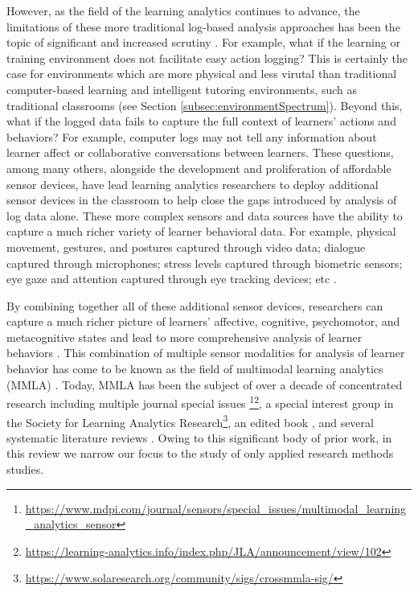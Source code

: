 \documentclass[manuscript,screen,review]{acmart}
\begin{document}
However, as the field of the learning analytics continues to advance, the limitations of these more traditional log-based analysis approaches has been the topic of significant and increased scrutiny \cite{ochoa2017multimodal}. For example, what if the learning or training environment does not facilitate easy action logging? This is certainly the case for environments which are more physical and less virutal than traditional computer-based learning and intelligent tutoring environments, such as traditional classrooms (see Section \ref{subsec:environmentSpectrum}). Beyond this, what if the logged data fails to capture the full context of learners' actions and behaviors? For example, computer logs may not tell any information about learner affect or collaborative conversations between learners. These questions, among many others, alongside the development and proliferation of affordable sensor devices, have lead learning analytics researchers to deploy additional sensor devices in the classroom to help close the gaps introduced by analysis of log data alone. These more complex sensors and data sources have the ability to capture a much richer variety of learner behavioral data. For example, physical movement, gestures, and postures captured through video data; dialogue captured through microphones; stress levels captured through biometric sensors; eye gaze and attention captured through eye tracking devices; etc \cite{vatral2022using}. 

By combining together all of these additional sensor devices, researchers can capture a much richer picture of learners' affective, cognitive, psychomotor, and metacognitive states and lead to more comprehensive analysis of learner behaviors \cite{blikstein2016multimodal}. This combination of multiple sensor modalities for analysis of learner behavior has come to be known as the field of multimodal learning analytics (MMLA) \cite{blikstein2013multimodal, blikstein2016multimodal, worsley_multimodal_2018}. Today, MMLA has been the subject of over a decade of concentrated research including multiple journal special issues \cite{BJETSpecialIssue}\footnote{\href{https://www.mdpi.com/journal/sensors/special_issues/multimodal_learning_analytics_sensor}{https://www.mdpi.com/journal/sensors/special\_issues/multimodal\_learning\_analytics\_sensor}}\footnote{\href{https://learning-analytics.info/index.php/JLA/announcement/view/102}{https://learning-analytics.info/index.php/JLA/announcement/view/102}}, a special interest group in the Society for Learning Analytics Research\footnote{\href{https://www.solaresearch.org/community/sigs/crossmmla-sig/}{https://www.solaresearch.org/community/sigs/crossmmla-sig/}}, an edited book \cite{MMLAHandbook}, and several systematic literature reviews \cite{Chango2022, Alwahaby2022, Shankar2018, Crescenzi2020, Mu2020, DiMitri2018, worsley_multimodal_2018}. Owing to this significant body of prior work, in this review we narrow our focus to the study of only applied research methods studies.
\end{document}
